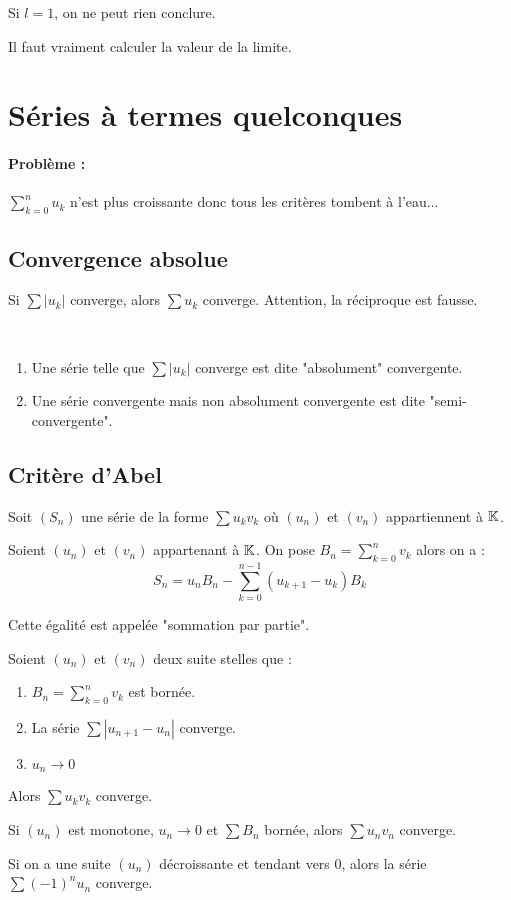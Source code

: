 \begin{rem}
Si $l=1$, on ne peut rien conclure.
\end{rem}
\begin{rem}
Il faut vraiment calculer la valeur de la limite.
\end{rem}
\section{Séries à termes quelconques}
\paragraph{Problème :} $\sum\limits_{k=0}^n u_k$ n'est plus croissante donc tous les critères tombent à l'eau...

\subsection{Convergence absolue}
\begin{thm}
Si $\sum|u_k|$ converge, alors $\sum u_k$ converge. Attention, la réciproque est fausse.
\end{thm}
\begin{defi}~
\begin{enumerate}
	\item Une série telle que $\sum |u_k|$ converge est dite "absolument" convergente.
	\item Une série convergente mais non absolument convergente est dite "semi-convergente". 
\end{enumerate}
\end{defi}

\subsection{Critère d'Abel}
Soit $(S_n)$ une série de la forme $\sum u_kv_k$ où $(u_n)$ et $(v_n)$ appartiennent à $\mathbb{K}$.

\begin{lem}
Soient $(u_n)$ et $(v_n)$ appartenant à $\mathbb{K}$. On pose $B_n=\sum\limits_{k=0}^nv_k$ alors on a :
$$S_n = u_nB_n-\sum\limits_{k=0}^{n-1}(u_{k+1}-u_k)B_k$$
\end{lem}
\begin{rem}
Cette égalité est appelée "sommation par partie".
\end{rem}

\begin{thm}
Soient $(u_n)$ et $(v_n)$ deux suite stelles que :
\begin{enumerate}
	\item $B_n=\sum\limits_{k=0}^nv_k$ est bornée.
	\item La série $\sum|u_{n+1}-u_n|$ converge.
	\item $u_n\to0$
\end{enumerate}
Alors $\sum u_kv_k$ converge.
\end{thm}


\begin{rem}\end{rem}

\begin{coro}
Si $(u_n)$ est monotone, $u_n\to0$ et $\sum B_n$ bornée, alors $\sum u_nv_n$ converge.
\end{coro}
\begin{coro}
Si on a une suite $(u_n)$ décroissante et tendant vers 0, alors la série $\sum (-1)^nu_n$ converge.
\end{coro}


